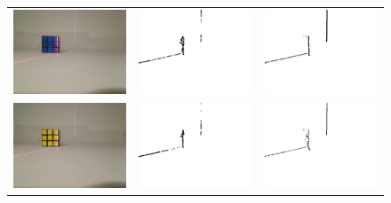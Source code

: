 \documentclass[ngerman,a4paper,parskip=half]{scrartcl}
\begin{document}
\begin{figure}[H]
\begin{tabular}{c|c|c}
		\includegraphics[width=.32\textwidth]{includes/blue_0.png} &
		\includegraphics[width=.32\textwidth]{includes/blue_0_diff.png} &
		\includegraphics[width=.32\textwidth]{includes/blue_0_free.png} \\
		
		\includegraphics[width=.32\textwidth]{includes/yellow_0.png} & 
		\includegraphics[width=.32\textwidth]{includes/yellow_0_diff.png} &
		\includegraphics[width=.32\textwidth]{includes/yellow_0_free.png} \\
		

\end{tabular}
\end{figure}
\end{document}

